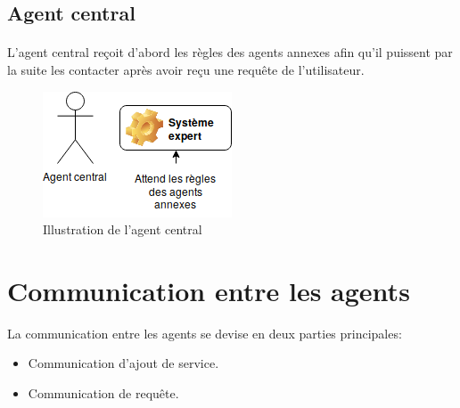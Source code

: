 \subsection{Agent central}
\paragraph{}
L’agent central reçoit d’abord les règles des agents annexes afin qu’il puissent par la suite les contacter après avoir reçu une requête de l’utilisateur.
\begin{figure}[H]
	\centering
	\includegraphics[scale=0.75]{imgs/centralAgent.png}
	\caption{Illustration de l'agent central}
	\label{fig:centralAgent}
\end{figure}


\section{Communication entre les agents}
La communication entre les agents se devise en deux parties principales:
\begin{itemize}
	\item Communication d’ajout de service.
	\item Communication de requête.
\end{itemize}

